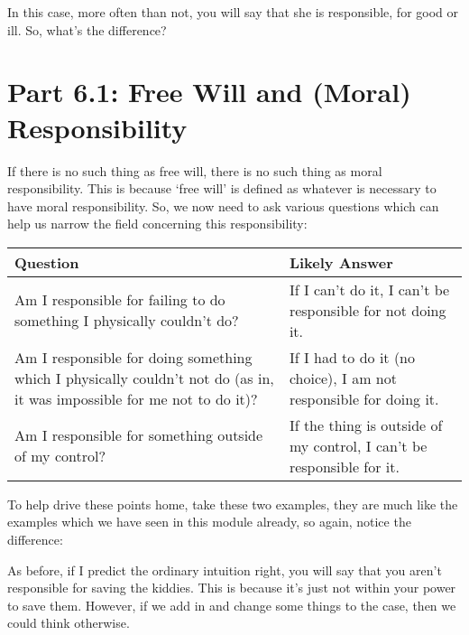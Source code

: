 
In this case, more often than not, you will say that she is responsible, for good or ill. So, what's the difference?  
\section{Part 6.1:  Free Will and (Moral) Responsibility}

If there is no such thing as free will, there is no such thing as moral responsibility. This is because ‘free will’ is defined as whatever is necessary to have moral responsibility. So, we now need to ask various questions which can help us narrow the field concerning this responsibility:
\begin{tabular}{p{1.75in}|p{1.75in}|}
Question&Likely Answer\\\hline
Am I responsible for failing to do something I physically couldn’t do?&If I can't do it, I can't be responsible for not doing it.\\
\hline
Am I responsible for doing something which I physically couldn’t not do (as in, it was impossible for me not to do it)?&If I had to do it (no choice), I am not responsible for doing it.\\
\hline
Am I responsible for something outside of my control?&If the thing is outside of my control, I can’t be responsible for it.
\end{tabular}

To help drive these points home, take these two examples, they are much like the examples which we have seen in this module already, so again, notice the difference:


As before, if I predict the ordinary intuition right, you will say that you aren't responsible for saving the kiddies. This is because it's just not within your power to save them. However, if we add in and change some things to the case, then we could think otherwise.

